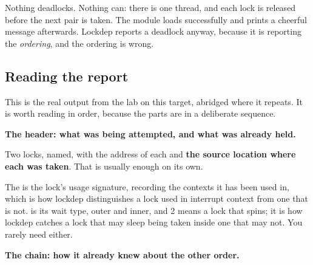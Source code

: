 \noindent Nothing deadlocks. Nothing can: there is one thread, and each lock is released before the
next pair is taken. The module loads successfully and prints a cheerful message afterwards. Lockdep
reports a deadlock anyway, because it is reporting the \emph{ordering}, and the ordering is wrong.

\subsection{Reading the report}
\label{c7:app:b4}

This is the real output from the lab on this target, abridged where it repeats. It is worth reading
in order, because the parts are in a deliberate sequence.

\textbf{The header: what was being attempted, and what was already held.}


\noindent Two locks, named, with the address of each and \textbf{the source location where each was
taken}. That is usually enough on its own.

The  is the lock's usage signature, recording the contexts it has been used in,
which is how lockdep distinguishes a lock used in interrupt context from one that is not.
 is its wait type, outer and inner, and 2 means a lock that spins; it is how lockdep
catches a lock that may sleep being taken inside one that may not. You rarely need either.

\textbf{The chain: how it already knew about the other order.}



